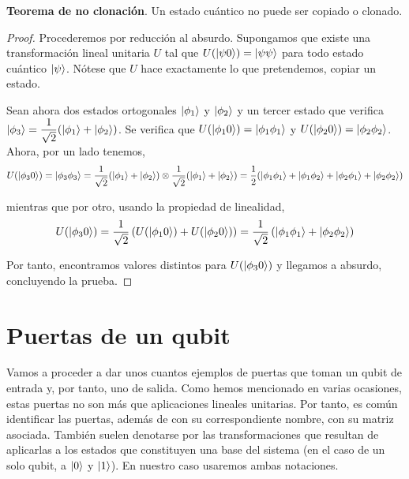 \begin{thm} \textbf{Teorema de no clonación}. Un estado cuántico no puede ser copiado o clonado.
\begin{proof}
Procederemos por reducción al absurdo. Supongamos que existe una transformación lineal unitaria $U$ tal que $U(\left|\psi0\right\rangle)=\left|\psi\psi\right\rangle$ para todo estado cuántico $\left|\psi\right\rangle$. Nótese que $U$ hace exactamente lo que pretendemos, copiar un estado.

Sean ahora dos estados ortogonales $\left|\phi_1\right\rangle$ y $\left|\phi_2\right\rangle$ y un tercer estado que verifica $\left|\phi_3\right\rangle=\dfrac{1}{\sqrt{2}}(\left|\phi_1\right\rangle+\left|\phi_2\right\rangle)$. Se verifica que $U(\left|\phi_10\right\rangle)=\left|\phi_1\phi_1\right\rangle$ y $U(\left|\phi_20\right\rangle)=\left|\phi_2\phi_2\right\rangle$. Ahora, por un lado tenemos,
\[U(\left|\phi_30\right\rangle)=\left|\phi_3\phi_3\right\rangle=\dfrac{1}{\sqrt{2}}(\left|\phi_1\right\rangle+\left|\phi_2\right\rangle)\otimes\dfrac{1}{\sqrt{2}}(\left|\phi_1\right\rangle+\left|\phi_2\right\rangle)=\dfrac{1}{2}(\left|\phi_1\phi_1\right\rangle+\left|\phi_1\phi_2\right\rangle+\left|\phi_2\phi_1\right\rangle+\left|\phi_2\phi_2\right\rangle)\]

mientras que por otro, usando la propiedad de linealidad,
\[U(\left|\phi_30\right\rangle)=\dfrac{1}{\sqrt{2}}\left(U(\left|\phi_10\right\rangle)+U(\left|\phi_20\right\rangle)\right)=\dfrac{1}{\sqrt{2}}\left(\left|\phi_1\phi_1\right\rangle+\left|\phi_2\phi_2\right\rangle\right)\]

Por tanto, encontramos valores distintos para $U(\left|\phi_30\right\rangle)$ y llegamos a absurdo, concluyendo la prueba.
\end{proof}
\end{thm}

\section{Puertas de un qubit}

Vamos a proceder a dar unos cuantos ejemplos de puertas que toman un qubit de entrada y, por tanto, uno de salida. Como hemos mencionado en varias ocasiones, estas puertas no son más que aplicaciones lineales unitarias. Por tanto, es común identificar las puertas, además de con su correspondiente nombre, con su matriz asociada. También suelen denotarse por las transformaciones que resultan de aplicarlas a los estados que constituyen una base del sistema (en el caso de un solo qubit, a $\left|0\right\rangle$ y $\left|1\right\rangle$). En nuestro caso usaremos ambas notaciones.

